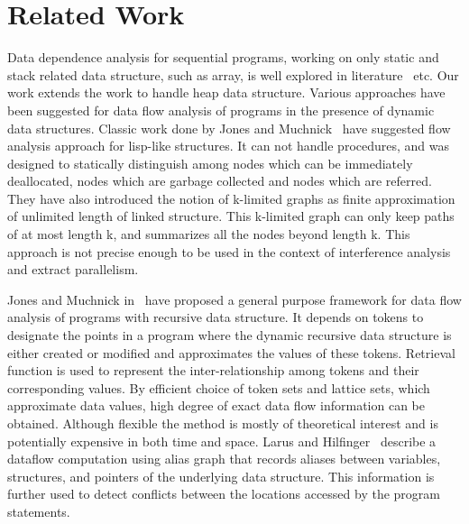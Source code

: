 \chapter{Related Work}
\label{ch:RelatedWork}
Data dependence analysis for sequential programs,  
working on only static and stack related data
structure, such as array, is well explored in
literature~\cite{Allen87automatic, Wolf91loop, Banerjee93automatic, Kennedy01Optimizing, Padua86} etc. 
Our work extends the work to handle heap 
data structure. Various approaches have been suggested for data flow analysis 
of programs in the presence of dynamic data structures. 
Classic work done by Jones and Muchnick~\cite{Jones81} have 
suggested flow analysis approach for lisp-like structures. 
  It can not handle procedures, and was designed to statically 
  distinguish among nodes which can be immediately deallocated, 
  nodes which are garbage collected and nodes 
  which are referred. They have also introduced the notion of k-limited graphs as 
  finite approximation of unlimited length of linked structure. This k-limited graph 
  can only keep paths of at most length k, and summarizes all the nodes beyond length k. This 
  approach is not precise enough to be used in the context of interference analysis 
  and extract parallelism. 
  
  Jones and Muchnick in~\cite{Jones82} have proposed a general purpose framework for data flow analysis of programs with recursive data structure. It depends on tokens to 
  designate the points in a program where the dynamic recursive data structure is either 
  created or modified and approximates the values of these tokens. Retrieval function 
  is used to represent the inter-relationship among tokens and their corresponding values. By efficient choice of token sets and lattice sets, which approximate data values, high degree of exact data flow information can be obtained. Although 
  flexible the method is mostly of theoretical interest and is potentially 
  expensive in both time and space. Larus and Hilfinger~\cite{Larus88} describe a dataflow computation 
using alias graph that records aliases between variables, structures, 
and pointers of the underlying data structure. This information is further used 
to detect conflicts between the locations accessed by the program statements. 
 
